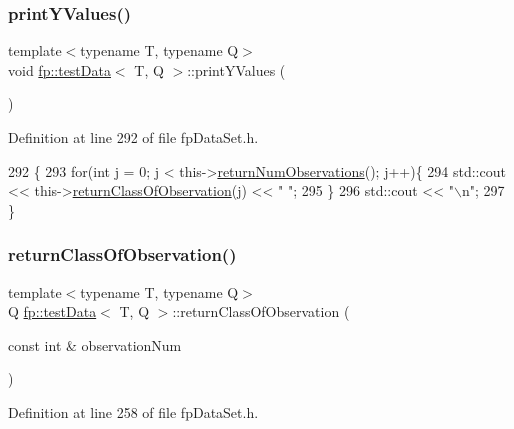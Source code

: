 \subsubsection{\texorpdfstring{print\+Y\+Values()}{printYValues()}}
{\footnotesize\ttfamily template$<$typename T, typename Q$>$ \\
void \hyperlink{classfp_1_1testData}{fp\+::test\+Data}$<$ T, Q $>$\+::print\+Y\+Values (\begin{DoxyParamCaption}{ }\end{DoxyParamCaption})\hspace{0.3cm}{\ttfamily [inline]}}



Definition at line 292 of file fp\+Data\+Set.\+h.


\begin{DoxyCode}
292                            \{
293             \textcolor{keywordflow}{for}(\textcolor{keywordtype}{int} j = 0; j < this->\hyperlink{classfp_1_1testData_af9dd7a4aa116d99a11838a02f2154c08}{returnNumObservations}(); j++)\{
294                 std::cout << this->\hyperlink{classfp_1_1testData_a3a964b20b07dd4b49e958fdde93ebc59}{returnClassOfObservation}(j) << \textcolor{stringliteral}{" "};
295             \}
296             std::cout << \textcolor{stringliteral}{"\(\backslash\)n"};
297         \}
\end{DoxyCode}
\mbox{\label{classfp_1_1testData_a3a964b20b07dd4b49e958fdde93ebc59}} 
\subsubsection{\texorpdfstring{return\+Class\+Of\+Observation()}{returnClassOfObservation()}}
{\footnotesize\ttfamily template$<$typename T, typename Q$>$ \\
Q \hyperlink{classfp_1_1testData}{fp\+::test\+Data}$<$ T, Q $>$\+::return\+Class\+Of\+Observation (\begin{DoxyParamCaption}\item[{const int \&}]{observation\+Num }\end{DoxyParamCaption})\hspace{0.3cm}{\ttfamily [inline]}}



Definition at line 258 of file fp\+Data\+Set.\+h.


